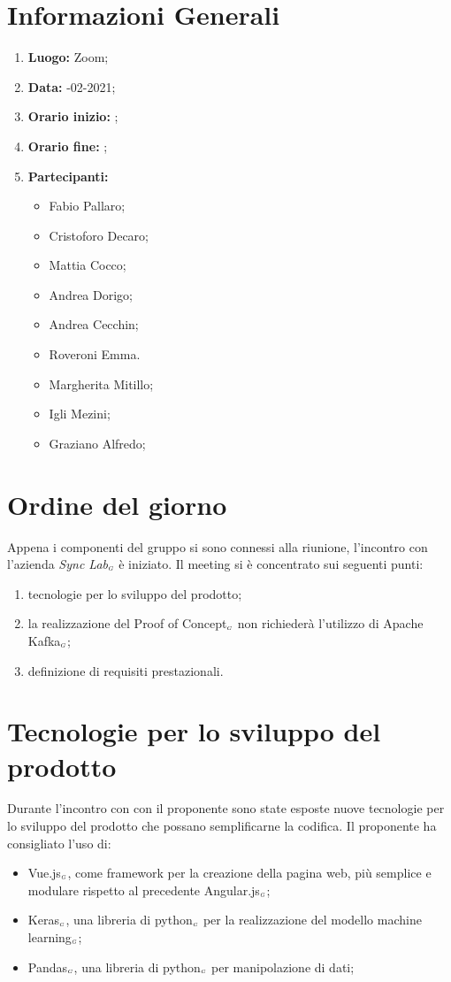 \newpage
\section{Informazioni Generali}
\begin{enumerate}
	\item \textbf{Luogo:} \normalfont Zoom;
	\item \textbf{Data:} -02-2021;
	\item \textbf{Orario inizio:} ;
	\item \textbf{Orario fine:} ;
	\item \textbf{Partecipanti:}
	\begin{itemize}
		\item Fabio Pallaro;
		\item Cristoforo Decaro;
		\item Mattia Cocco; 
		\item Andrea Dorigo;
		\item Andrea Cecchin;
		\item Roveroni Emma.
		\item Margherita Mitillo;
		\item Igli Mezini;
		\item Graziano Alfredo;
	\end{itemize}
\end{enumerate}
\section{Ordine del giorno}
Appena i componenti del gruppo si sono connessi alla riunione, l'incontro con l'azienda \textit{Sync Lab}$_{\scaleto{G}{3pt}}$ è iniziato.
Il meeting si è concentrato sui seguenti punti:
\begin{enumerate}
	\item tecnologie per lo sviluppo del prodotto;
	\item la realizzazione del Proof of Concept$_{\scaleto{G}{3pt}}$ non richiederà l'utilizzo di Apache Kafka$_{\scaleto{G}{3pt}}$;
	\item definizione di requisiti prestazionali.
\end{enumerate}
\section{Tecnologie per lo sviluppo del prodotto}
Durante l'incontro con con il proponente sono state esposte nuove tecnologie per lo sviluppo del prodotto che possano semplificarne la codifica. Il proponente ha consigliato l'uso di:
\begin{itemize}
	\item Vue.js$_{\scaleto{G}{3pt}}$, come framework per la creazione della pagina web, più semplice e modulare rispetto al precedente Angular.js$_{\scaleto{G}{3pt}}$;
	\item Keras$_{\scaleto{G}{3pt}}$, una libreria di python$_{\scaleto{G}{3pt}}$ per la realizzazione del modello machine learning$_{\scaleto{G}{3pt}}$;
	\item Pandas$_{\scaleto{G}{3pt}}$, una libreria di python$_{\scaleto{G}{3pt}}$ per manipolazione di dati;
\end{itemize} 
